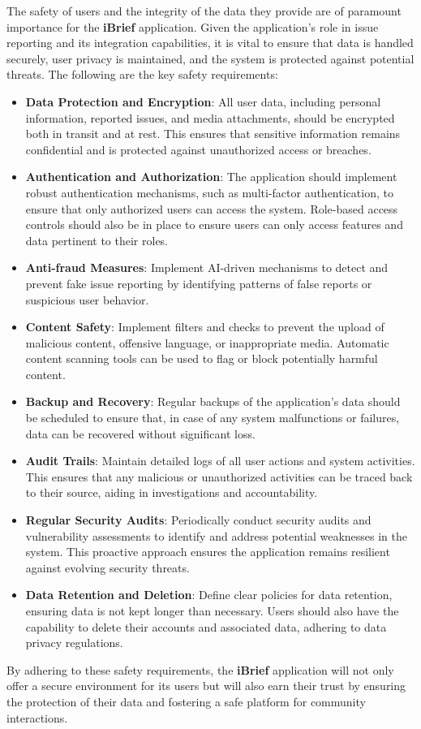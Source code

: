 The safety of users and the integrity of the data they provide are of paramount importance for the \textbf{iBrief} application. Given the application's role in issue reporting and its integration capabilities, it is vital to ensure that data is handled securely, user privacy is maintained, and the system is protected against potential threats. The following are the key safety requirements:

\begin{itemize}
    \item \textbf{Data Protection and Encryption}: All user data, including personal information, reported issues, and media attachments, should be encrypted both in transit and at rest. This ensures that sensitive information remains confidential and is protected against unauthorized access or breaches.
    
    \item \textbf{Authentication and Authorization}: The application should implement robust authentication mechanisms, such as multi-factor authentication, to ensure that only authorized users can access the system. Role-based access controls should also be in place to ensure users can only access features and data pertinent to their roles.
    
    \item \textbf{Anti-fraud Measures}: Implement AI-driven mechanisms to detect and prevent fake issue reporting by identifying patterns of false reports or suspicious user behavior.
    
    \item \textbf{Content Safety}: Implement filters and checks to prevent the upload of malicious content, offensive language, or inappropriate media. Automatic content scanning tools can be used to flag or block potentially harmful content.
    
    \item \textbf{Backup and Recovery}: Regular backups of the application's data should be scheduled to ensure that, in case of any system malfunctions or failures, data can be recovered without significant loss.
    
    \item \textbf{Audit Trails}: Maintain detailed logs of all user actions and system activities. This ensures that any malicious or unauthorized activities can be traced back to their source, aiding in investigations and accountability.
    
    \item \textbf{Regular Security Audits}: Periodically conduct security audits and vulnerability assessments to identify and address potential weaknesses in the system. This proactive approach ensures the application remains resilient against evolving security threats.
    
    \item \textbf{Data Retention and Deletion}: Define clear policies for data retention, ensuring data is not kept longer than necessary. Users should also have the capability to delete their accounts and associated data, adhering to data privacy regulations.
\end{itemize}

By adhering to these safety requirements, the \textbf{iBrief} application will not only offer a secure environment for its users but will also earn their trust by ensuring the protection of their data and fostering a safe platform for community interactions.

